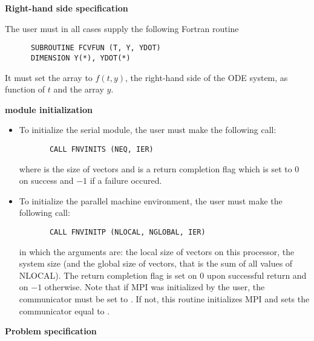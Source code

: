 \begin{Steps}
  
\item {\bf Right-hand side specification}
  
  The user must in all cases supply the following Fortran routine
\begin{verbatim}
      SUBROUTINE FCVFUN (T, Y, YDOT)
      DIMENSION Y(*), YDOT(*)
\end{verbatim}
  It must set the  array to $f(t,y)$, the right-hand side of the ODE
  system, as function of  $t$ and the array  $y$.  
  
\item  {\bf {\nvector} module initialization}

  \begin{itemize}
  \item {\s}
    To initialize the serial {\nvector} module, the user must make the following call:
\begin{verbatim}
       CALL FNVINITS (NEQ, IER)
\end{verbatim}
    where  is the size of vectors and
     is a  return completion flag which is set to $0$ on success and $-1$ 
    if a failure occured.
    
  \item {\p}
    To initialize the parallel machine environment, the user must make the following call:
\begin{verbatim}
       CALL FNVINITP (NLOCAL, NGLOBAL, IER)
\end{verbatim}
    in which the arguments are:  the local size of vectors on this processor,
     the system size (and the global size of vectors, that is the sum 
    of all values of NLOCAL). The return completion flag  is set on $0$ upon
    successful return and on $-1$ otherwise.
    Note that if MPI was initialized by the user, the communicator must be
    set to .  If not, this routine initializes MPI and sets
    the communicator equal to .
  \end{itemize}
  
\item {\bf Problem specification}


\end{Steps}
